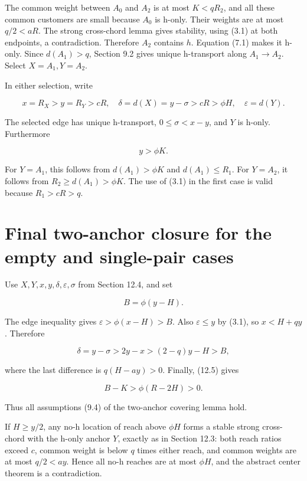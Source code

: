 \documentclass[11pt,a4paper]{article}
\begin{document}
The common weight between \(A_0\) and \(A_2\) is at most \(K<qR_2\), and all these common customers are small because \(A_0\) is h-only. Their weights are at most \(q/2<aR\). The strong cross-chord lemma gives stability, using (3.1) at both endpoints, a contradiction. Therefore \(A_2\) contains \(h\). Equation (7.1) makes it h-only. Since \(d(A_1)>q\), Section 9.2 gives unique h-transport along \(A_1\to A_2\). Select \(X=A_1,Y=A_2\).

In either selection, write

\[
x=R_X>y=R_Y>cR,\quad \delta=d(X)=y-\sigma>cR>\phi H,
\quad \varepsilon=d(Y).
\]

The selected edge has unique h-transport, \(0\le\sigma<x-y\), and \(Y\) is h-only. Furthermore

\[
y>\phi K. \tag{12.5}
\]

For \(Y=A_1\), this follows from \(d(A_1)>\phi K\) and \(d(A_1)\le R_1\). For \(Y=A_2\), it follows from \(R_2\ge d(A_1)>\phi K\). The use of (3.1) in the first case is valid because \(R_1>cR>q\).

\hypertarget{final-two-anchor-closure-for-the-empty-and-single-pair-cases}{%
\section{Final two-anchor closure for the empty and single-pair cases}\label{final-two-anchor-closure-for-the-empty-and-single-pair-cases}}

Use \(X,Y,x,y,\delta,\varepsilon,\sigma\) from Section 12.4, and set

\[
B=\phi(y-H).
\]

The edge inequality gives \(\varepsilon>\phi(x-H)>B\). Also \(\varepsilon\le y\) by (3.1), so \(x<H+qy\). Therefore

\[
\delta=y-\sigma>2y-x>(2-q)y-H>B,
\]

where the last difference is \(q(H-ay)>0\). Finally, (12.5) gives

\[
B-K>\phi(R-2H)>0. \tag{13.1}
\]

Thus all assumptions (9.4) of the two-anchor covering lemma hold.

If \(H\ge y/2\), any no-h location of reach above \(\phi H\) forms a stable strong cross-chord with the h-only anchor \(Y\), exactly as in Section 12.3: both reach ratios exceed \(c\), common weight is below \(q\) times either reach, and common weights are at most \(q/2<a y\). Hence all no-h reaches are at most \(\phi H\), and the abstract center theorem is a contradiction.
\end{document}
